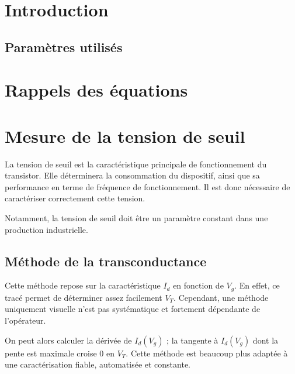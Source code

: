 \documentclass[a4paper,11pt]{report}
\begin{document}


\chapter*{Introduction}


\section*{Paramètres utilisés}

\chapter{Rappels des équations}

\chapter{Mesure de la tension de seuil}
La tension de seuil est la caractéristique principale de fonctionnement du transistor. Elle déterminera la consommation du dispositif, ainsi que sa performance en terme de fréquence de fonctionnement. Il est donc nécessaire de caractériser correctement cette tension.

Notamment, la tension de seuil doit être un paramètre constant dans une production industrielle.

\section{Méthode de la transconductance}
Cette méthode repose sur la caractéristique $I_d$ en fonction de $V_g$. En effet, ce tracé permet de déterminer assez facilement $V_T$. Cependant, une méthode uniquement visuelle n'est pas systématique et fortement dépendante de l'opérateur.

On peut alors calculer la dérivée de $I_d(V_g)$ ; la tangente à $I_d(V_g)$ dont la pente est maximale croise 0 en $V_T$. Cette méthode est beaucoup plus adaptée à une caractérisation fiable, automatisée et constante.


\end{document}
